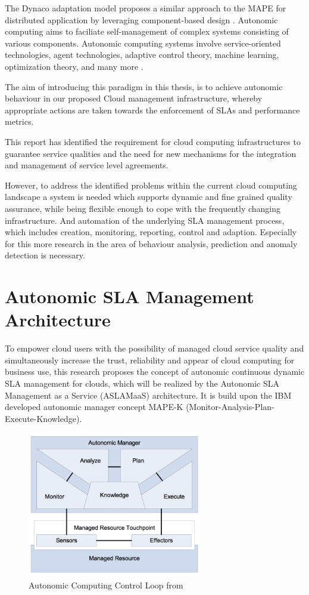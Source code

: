 The Dynaco adaptation model proposes a similar approach to the MAPE for distributed application by leveraging component-based design  \citep{buisson2005dynamic}  \citep{buisson2006adaptation}. Autonomic computing aims to faciliate self-management of complex systems consisting of various components. Autonomic computing systems involve service-oriented technologies, agent technologies, adaptive control theory, machine learning, optimization theory, and many more  \citep{fei2005design}  \citep{zhao2009survey}. 
 
The aim of introducing this paradigm in this thesis, is to achieve autonomic behaviour in our proposed Cloud management infrastructure, whereby appropriate actions are taken towards the enforcement of SLAs and performance metrics.

This report has identified the requirement for cloud computing infrastructures to guarantee service qualities and the need for new mechanisms for the integration and management of service level agreements. 


However, to address the identified problems within the current cloud computing landscape a system is needed which supports dynamic and fine grained quality assurance, while being flexible enough to cope with the frequently changing infrastructure. And automation of the underlying SLA management process, which includes creation,  monitoring, reporting, control and adaption. Especially for this more research in the area of behaviour analysis, prediction and anomaly detection is necessary.

\section{Autonomic SLA Management Architecture}
To empower cloud users with the possibility of  managed cloud service quality and simultaneously increase the trust, reliability and appear of cloud computing for business use, this research proposes the concept of autonomic continuous dynamic SLA management for clouds, which will be realized by the Autonomic SLA Management as a Service (ASLAMaaS) architecture. It is build upon the IBM developed autonomic manager concept MAPE-K  \cite{MAPE-K} (Monitor-Analysis-Plan-Execute-Knowledge).

\begin{figure}[!ht]
\centering
\includegraphics[width=3in]{chapters/chapter4/fig/MAPE.PNG}
\caption{Autonomic Computing Control Loop from  \cite{MAPE-K}}
\label{fig_MAPE}
\end{figure}

